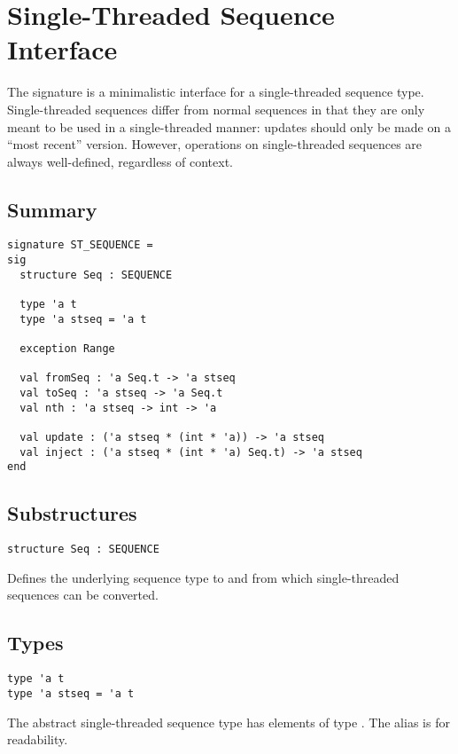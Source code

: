 \chapter{Single-Threaded Sequence Interface}
\label{ch:st-seq-interface}
\begin{preamble}
The  signature is a minimalistic interface for a
single-threaded sequence type. Single-threaded sequences differ from normal
sequences in that they are only meant to be used in a single-threaded
manner: updates should only be made on a ``most recent'' version. However,
operations on single-threaded sequences are always well-defined, regardless of
context.
\end{preamble}

\section{Summary}
\begin{gram}
\begin{verbatim}
signature ST_SEQUENCE =
sig
  structure Seq : SEQUENCE

  type 'a t
  type 'a stseq = 'a t

  exception Range

  val fromSeq : 'a Seq.t -> 'a stseq
  val toSeq : 'a stseq -> 'a Seq.t
  val nth : 'a stseq -> int -> 'a

  val update : ('a stseq * (int * 'a)) -> 'a stseq
  val inject : ('a stseq * (int * 'a) Seq.t) -> 'a stseq
end
\end{verbatim}
\end{gram}

\section{Substructures}

\begin{gram}[Seq]
\label{gr:st-seq-interface:Seq}
\begin{verbatim}
structure Seq : SEQUENCE
\end{verbatim}
Defines the underlying sequence type to and from which single-threaded
sequences can be converted.
\end{gram}


\section{Types}

\begin{gram}
\begin{verbatim}
type 'a t
type 'a stseq = 'a t
\end{verbatim}
The abstract single-threaded sequence type  has elements of type
. The alias  is for readability.
\end{gram}


